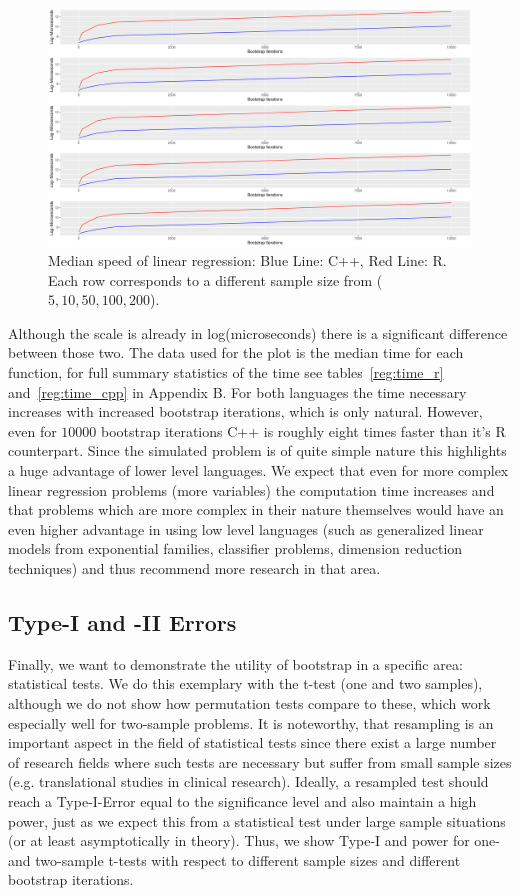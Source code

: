 \begin{figure}
\centering
	\includegraphics[scale=0.4]{./figures/plot_regression.pdf}
	\caption[Regression Complexity]{Median speed of linear regression: Blue Line: C++, Red Line: R. Each row corresponds to a different sample size from ($5, 10, 50, 100, 200$).}
	\label{fig:regErr}
\end{figure}

\noindent Although the scale is already in log(microseconds) there is a significant difference between those two. The data used for the plot is the median time for each function, for full summary statistics of the time see tables~\ref{reg:time_r} and~\ref{reg:time_cpp} in Appendix B. For both languages the time necessary increases with increased bootstrap iterations, which is only natural. However, even for $10000$ bootstrap iterations C++ is roughly eight times faster than it's R counterpart. Since the simulated problem is of quite simple nature this highlights a huge advantage of lower level languages. We expect that even for more complex linear regression problems (more variables) the computation time increases and that problems which are more complex in their nature themselves would have an even higher advantage in using low level languages (such as generalized linear models from exponential families, classifier problems, dimension reduction techniques) and thus recommend more research in that area.

\subsection{Type-I and -II Errors}
Finally, we want to demonstrate the utility of bootstrap in a specific area: statistical tests. We do this exemplary with the t-test (one and two samples), although we do not show how permutation tests compare to these, which work especially well for two-sample problems. It is noteworthy, that resampling is an important aspect in the field of statistical tests since there exist a large number of research fields where such tests are necessary but suffer from small sample sizes (e.g. translational studies in clinical research). Ideally, a resampled test should reach a Type-I-Error equal to the significance level and also maintain a high power, just as we expect this from a statistical test under large sample situations (or at least asymptotically in theory). Thus, we show Type-I and power for one- and two-sample t-tests with respect to different sample sizes and different bootstrap iterations. 

